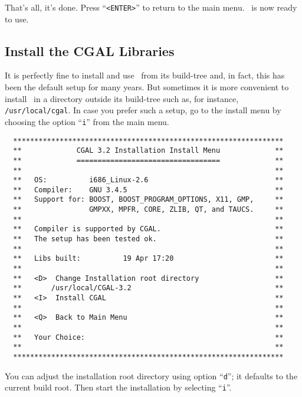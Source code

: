 That's all, it's done. Press ``\texttt{<ENTER>}'' to return to the
main menu. \cgal\ is now ready to use.

\subsection{Install the CGAL Libraries\label{sec:install-the-libs}}

It is perfectly fine to install and use \cgal\ from its build-tree
and, in fact, this has been the default setup for many years. But
sometimes it is more convenient to install \cgal\ in a directory
outside its build-tree such as, for instance,
\texttt{/usr/local/cgal}. In case you prefer such a setup, go to the
install menu by choosing the option ``\texttt{i}'' from the main menu.

{\ccTexHtml{\scriptsize}{}
\begin{verbatim}
  ****************************************************************
  **             CGAL 3.2 Installation Install Menu             **
  **             ==================================             **
  **                                                            **
  **   OS:          i686_Linux-2.6                              **
  **   Compiler:    GNU 3.4.5                                   **
  **   Support for: BOOST, BOOST_PROGRAM_OPTIONS, X11, GMP,     **
  **                GMPXX, MPFR, CORE, ZLIB, QT, and TAUCS.     **
  **                                                            **
  **   Compiler is supported by CGAL.                           **
  **   The setup has been tested ok.                            **
  **                                                            **
  **   Libs built:          19 Apr 17:20                        **
  **                                                            **
  **   <D>  Change Installation root directory                  **
  **       /usr/local/CGAL-3.2                                  **
  **   <I>  Install CGAL                                        **
  **                                                            **
  **   <Q>  Back to Main Menu                                   **
  **                                                            **
  **   Your Choice:                                             **
  **                                                            **
  ****************************************************************
\end{verbatim}
}

You can adjust the installation root directory using option
``\texttt{d}''; it defaults to the current build root. Then start the
installation by selecting ``\texttt{i}''.


